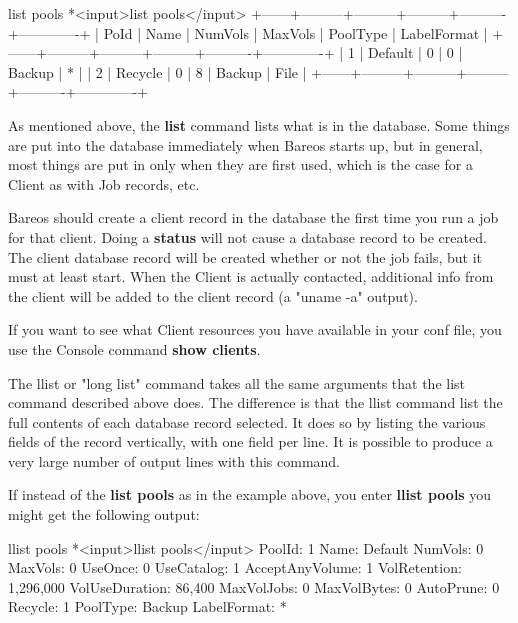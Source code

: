 \begin{description}
\begin{bconsole}{list pools}
*<input>list pools</input>
+------+---------+---------+---------+----------+-------------+
| PoId | Name    | NumVols | MaxVols | PoolType | LabelFormat |
+------+---------+---------+---------+----------+-------------+
|    1 | Default |       0 |       0 | Backup   | *           |
|    2 | Recycle |       0 |       8 | Backup   | File        |
+------+---------+---------+---------+----------+-------------+
\end{bconsole}

   As mentioned above, the {\bf list} command lists what is in the
   database.  Some things are put into the database immediately when Bareos
   starts up, but in general, most things are put in only when they are
   first used, which is the case for a Client as with Job records, etc.

   Bareos should create a client record in the database the first time you
   run a job for that client.  Doing a {\bf status} will not cause a
   database record to be created.  The client database record will be
   created whether or not the job fails, but it must at least start.  When
   the Client is actually contacted, additional info from the client will
   be added to the client record (a "uname -a" output).

   If you want to see what Client resources you have available in your conf
   file, you use the Console command {\bf show clients}.

\item [llist]
   The llist or "long list" command takes all the same arguments that the
   list command described above does.  The difference is that the llist
   command list the full contents of each database record selected.  It
   does so by listing the various fields of the record vertically, with one
   field per line.  It is possible to produce a very large number of output
   lines with this command.

   If instead of the {\bf list pools} as in the example above, you enter
   {\bf llist pools} you might get the following output:

\begin{bconsole}{llist pools}
*<input>llist pools</input>
          PoolId: 1
            Name: Default
         NumVols: 0
         MaxVols: 0
         UseOnce: 0
      UseCatalog: 1
 AcceptAnyVolume: 1
    VolRetention: 1,296,000
  VolUseDuration: 86,400
      MaxVolJobs: 0
     MaxVolBytes: 0
       AutoPrune: 0
         Recycle: 1
        PoolType: Backup
     LabelFormat: *


\end{bconsole}
\end{description}
